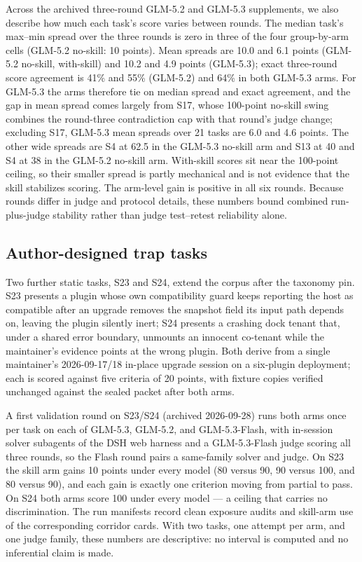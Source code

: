 \documentclass[11pt]{article}
\begin{document}
Across the archived three-round GLM-5.2 and GLM-5.3 supplements, we also describe how much each task's score varies between rounds. The median task's max--min spread over the three rounds is zero in three of the four group-by-arm cells (GLM-5.2 no-skill: 10 points). Mean spreads are 10.0 and 6.1 points (GLM-5.2 no-skill, with-skill) and 10.2 and 4.9 points (GLM-5.3); exact three-round score agreement is 41\% and 55\% (GLM-5.2) and 64\% in both GLM-5.3 arms. For GLM-5.3 the arms therefore tie on median spread and exact agreement, and the gap in mean spread comes largely from S17, whose 100-point no-skill swing combines the round-three contradiction cap with that round's judge change; excluding S17, GLM-5.3 mean spreads over 21 tasks are 6.0 and 4.6 points. The other wide spreads are S4 at 62.5 in the GLM-5.3 no-skill arm and S13 at 40 and S4 at 38 in the GLM-5.2 no-skill arm. With-skill scores sit near the 100-point ceiling, so their smaller spread is partly mechanical and is not evidence that the skill stabilizes scoring. The arm-level gain is positive in all six rounds. Because rounds differ in judge and protocol details, these numbers bound combined run-plus-judge stability rather than judge test--retest reliability alone.

\subsection{Author-designed trap tasks}\label{app:s23s24}
Two further static tasks, S23 and S24, extend the corpus after the taxonomy pin. S23 presents a plugin whose own compatibility guard keeps reporting the host as compatible after an upgrade removes the snapshot field its input path depends on, leaving the plugin silently inert; S24 presents a crashing dock tenant that, under a shared error boundary, unmounts an innocent co-tenant while the maintainer's evidence points at the wrong plugin. Both derive from a single maintainer's 2026-09-17/18 in-place upgrade session on a six-plugin deployment; each is scored against five criteria of 20 points, with fixture copies verified unchanged against the sealed packet after both arms.

A first validation round on S23/S24 (archived 2026-09-28) runs both arms once per task on each of GLM-5.3, GLM-5.2, and GLM-5.3-Flash, with in-session solver subagents of the DSH web harness and a GLM-5.3-Flash judge scoring all three rounds, so the Flash round pairs a same-family solver and judge. On S23 the skill arm gains 10 points under every model (80 versus 90, 90 versus 100, and 80 versus 90), and each gain is exactly one criterion moving from partial to pass. On S24 both arms score 100 under every model --- a ceiling that carries no discrimination. The run manifests record clean exposure audits and skill-arm use of the corresponding corridor cards. With two tasks, one attempt per arm, and one judge family, these numbers are descriptive: no interval is computed and no inferential claim is made.
\end{document}
